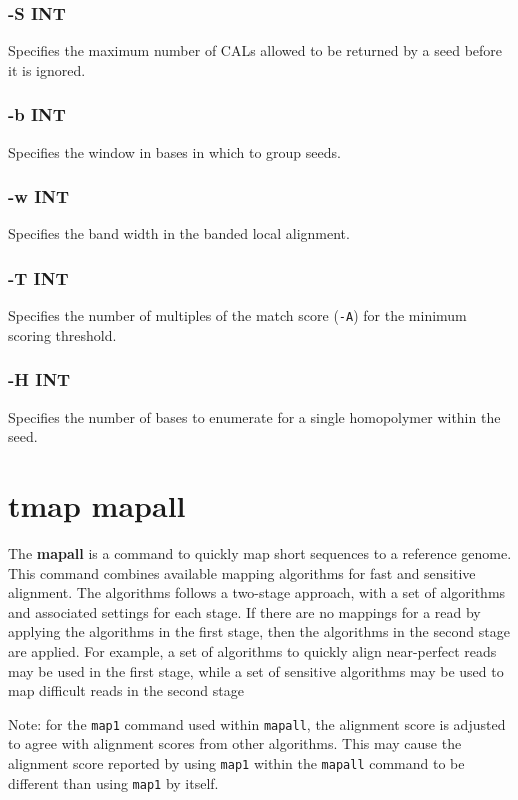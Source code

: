 \documentclass[a4paper,12pt]{book}
\newcommand{\TT}[1]{{\tt #1}} %
\newcommand{\BF}[1]{{\bf #1}} %
\begin{document}
\subsubsection{-S INT}
Specifies the maximum number of CALs allowed to be returned by a seed before it is ignored.

\subsubsection{-b INT}
Specifies the window in bases in which to group seeds.

\subsubsection{-w INT}
Specifies the band width in the banded local alignment.

\subsubsection{-T INT}
Specifies the number of multiples of the match score (\TT{-A}) for the minimum scoring threshold.

\subsubsection{-H INT}
Specifies the number of bases to enumerate for a single homopolymer within the seed.

\section{tmap mapall}
\label{sec:mapall}
The \BF{mapall} is a command to quickly map short sequences to a reference genome.
This command combines available mapping algorithms for fast and sensitive alignment.
The algorithms follows a two-stage approach, with a set of algorithms and associated settings for each stage.
If there are no mappings for a read by applying the algorithms in the first stage, then the algorithms in the second stage are applied. 
For example, a set of algorithms to quickly align near-perfect reads may be used in the first stage, while a set of sensitive algorithms may be used to map difficult reads in the second stage

Note: for the \TT{map1} command used within \TT{mapall}, the alignment score is adjusted to agree with alignment scores from other algorithms.
This may cause the alignment score reported by using \TT{map1} within the \TT{mapall} command to be different than using \TT{map1} by itself.
\end{document}
